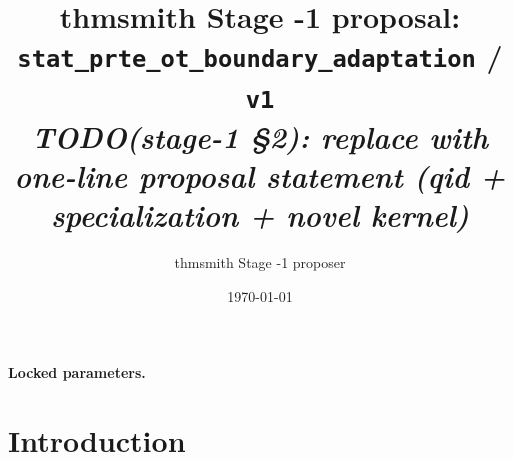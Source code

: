 \documentclass[11pt]{article}
\title{thmsmith Stage -1 proposal: \texttt{stat\_prte\_ot\_boundary\_adaptation} / \texttt{v1}%
  \\ \large\textit{TODO(stage-1 \S2): replace with one-line proposal statement (qid + specialization + novel kernel)}}
\author{thmsmith Stage -1 proposer}
\date{\today}
\theoremstyle{definition}
\theoremstyle{plain}
\theoremstyle{remark}
\begin{document}
\maketitle


\paragraph{Locked parameters.}

\begin{abstract}
\end{abstract}

\section{Introduction}
%
%
%
%
\end{document}
